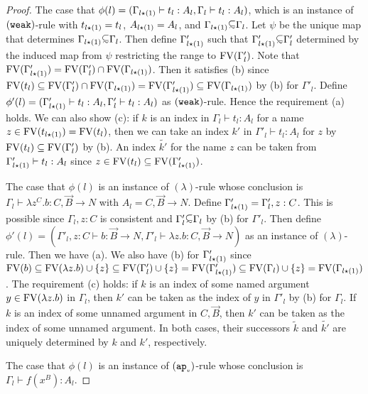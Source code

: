 \begin{proof}
  The case that $\phi(l) = (\Gamma_{l{\star}(1)}\vdash t_l:A_l,\Gamma_{l}\vdash t_l:A_l)$,
  which is an instance of $({\tt weak})$-rule with
  $t_{l{\star}(1)} = t_l$, $A_{l{\star}(1)} = A_{l}$, and
  $\Gamma_{l\conc(1)}\subseteqsim \Gamma_l$.
  Let $\psi$ be the unique map that determines $\Gamma_{l\conc(1)}\subseteqsim \Gamma_l$.
  Then define $\Gamma'_{l{\star}(1)}$ such that
  $\Gamma'_{l\conc(1)}\subseteqsim \Gamma'_l$ determined by
  the induced map from $\psi$ restricting the range to ${{\rm FV}}(\Gamma'_l)$.
  Note that ${{\rm FV}}(\Gamma'_{l{\star}(1)}) = {{\rm FV}}(\Gamma'_l)\cap{{\rm FV}}(\Gamma_{l{\star}(1)})$. 
  Then it satisfies (b) since ${{\rm FV}}(t_l)\subseteq {{\rm FV}}(\Gamma'_l) \cap {{\rm FV}}(\Gamma_{l{\star}(1)}) = {{\rm FV}}(\Gamma'_{l{\star}(1)}) \subseteq {{\rm FV}}(\Gamma_{l{\star}(1)})$ by (b) for $\Gamma'_l$.
  Define $\phi'(l) = (\Gamma'_{l{\star}(1)}\vdash t_l:A_l,\Gamma'_{l}\vdash t_l:A_l)$
  as $({\tt weak})$-rule.
  Hence the requirement (a) holds.
  We can also show (c): if $k$ is an index in $\Gamma_l\vdash t_l:A_l$ for a name
  $z\in{{\rm FV}}(t_{l{\star}(1)}) = {{\rm FV}}(t_l)$, then we can take an index $k'$
  in $\Gamma'_l\vdash t_l:A_l$ for $z$ by ${{\rm FV}}(t_l)\subseteq{{\rm FV}}(\Gamma'_l)$ by (b). 
  An index $\tilde{k'}$ for the name $z$ can be taken
  from $\Gamma'_{l{\star}(1)}\vdash t_l:A_l$
  since $z \in {{\rm FV}}(t_l) \subseteq {{\rm FV}}(\Gamma'_{l{\star}(1)})$. 
  
  The case that $\phi(l)$ is an instance of $(\lambda)$-rule
  whose conclusion is $\Gamma_l\vdash\lambda z^C.b:C,\vec{B}\to N$
  with $A_l=C,\vec{B}\to N$. 
  Define $\Gamma'_{l{\star}(1)} = \Gamma'_l,z:C$.
  This is possible since $\Gamma_l,z:C$ is consistent
  and $\Gamma'_l\subseteqsim \Gamma_l$ by (b) for $\Gamma'_l$.
  Then define
  $\phi'(l) = (\Gamma'_{l},z:C\vdash b:\vec{B}\to N, \Gamma'_l\vdash \lambda z.b:C,\vec{B}\to N)$ as an instance of $(\lambda)$-rule.
  Then we have (a). 
  We also have (b) for $\Gamma'_{l{\star}(1)}$
  since ${{\rm FV}}(b) \subseteq {{\rm FV}}(\lambda z.b) \cup \{z\} \subseteq {{\rm FV}}(\Gamma'_l)\cup\{z\} = {{\rm FV}}(\Gamma'_{l{\star}(1)}) \subseteq {{\rm FV}}(\Gamma_l)\cup\{z\} = {{\rm FV}}(\Gamma_{l{\star}(1)})$.
  The requirement (c) holds: 
  if $k$ is an index of some named argument $y\in{{\rm FV}}(\lambda z.b)$ in $\Gamma_l$,
  then $k'$ can be taken as the index of $y$ in $\Gamma'_l$ by (b) for $\Gamma_l$.
  If $k$ is an index of some unnamed argument in $C,\vec{B}$,
  then $k'$ can be taken as the index of some unnamed argument. 
  In both cases, their successors $\tilde{k}$ and $\tilde{k'}$ are uniquely
  determined by $k$ and $k'$, respectively. 
  
  The case that $\phi(l)$ is an instance of $({{\tt ap}_{\mbox{\tiny $v$}}})$-rule
  whose conclusion is $\Gamma_l\vdash f(x^B):A_l$. 


\end{proof}
